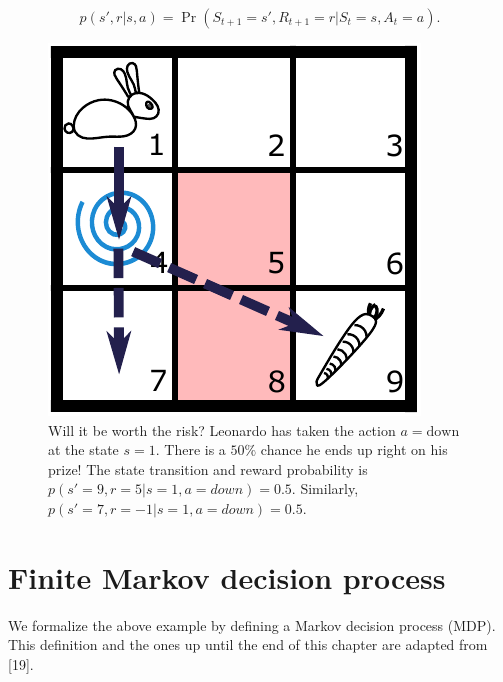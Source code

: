 \documentclass[
  letterpaper,
]{report}
\theoremstyle{plain}
\theoremstyle{definition}
\theoremstyle{definition}
\theoremstyle{remark}
\begin{document}
\[
p(s',r|s,a) = \Pr(S_{t+1} = s', R_{t+1} = r | S_t = s, A_t = a).
\]

\begin{figure}

{\centering \includegraphics{./images/bunny_teleporter.pdf}

}

\caption{\label{fig-gridworld_teleporter}Will it be worth the risk?
Leonardo has taken the action \(a = \text{down}\) at the state \(s=1\).
There is a \(50\%\) chance he ends up right on his prize! The state
transition and reward probability is \(p(s'=9,r=5|s=1,a=down) = 0.5\).
Similarly, \(p(s'=7,r=-1|s=1,a=down) = 0.5\).}

\end{figure}

\hypertarget{finite-markov-decision-process}{%
\section{Finite Markov decision
process}\label{finite-markov-decision-process}}

We formalize the above example by defining a Markov decision process
(MDP). This definition and the ones up until the end of this chapter are
adapted from {[}19{]}.
\end{document}
